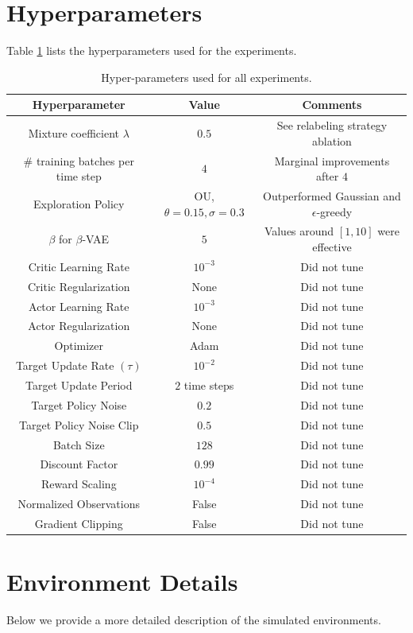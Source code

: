 \section{Hyperparameters}
Table \ref{table:hyperparams} lists the hyperparameters used for the experiments.
\begin{table}[h]
\centering
\begin{tabular}{c|c|c}
\hline
\textbf{Hyperparameter} & \textbf{Value} & \textbf{Comments}\\
\hline
Mixture coefficient $\lambda$ & $0.5$ & See relabeling strategy ablation \\
\# training batches per time step & $4$ & Marginal improvements after $4$\\
Exploration Policy & OU, $\theta = 0.15, \sigma = 0.3$ & Outperformed Gaussian and $\epsilon$-greedy\\
$\beta$ for $\beta$-VAE & $5$ & Values around $[1, 10]$ were effective \\
Critic Learning Rate &$10^{-3}$ & Did not tune\\
Critic Regularization & None & Did not tune\\
Actor Learning Rate & $10^{-3}$ & Did not tune\\
Actor Regularization & None & Did not tune\\
Optimizer & Adam & Did not tune\\
Target Update Rate $(\tau)$ & $10^{-2}$ & Did not tune\\
Target Update Period & $2$ time steps & Did not tune\\
Target Policy Noise & $0.2$ & Did not tune\\
Target Policy Noise Clip & $0.5$ & Did not tune\\
Batch Size & $128$ & Did not tune\\
Discount Factor & $0.99$ & Did not tune\\
Reward Scaling & $10^{-4}$ & Did not tune\\
Normalized Observations & False & Did not tune\\
Gradient Clipping & False & Did not tune\\
\hline
\end{tabular}
\vspace{0.1cm}
\caption{Hyper-parameters used for all experiments.}
\label{table:hyperparams}
\end{table}

\section{Environment Details}
Below we provide a more detailed description of the simulated environments.

